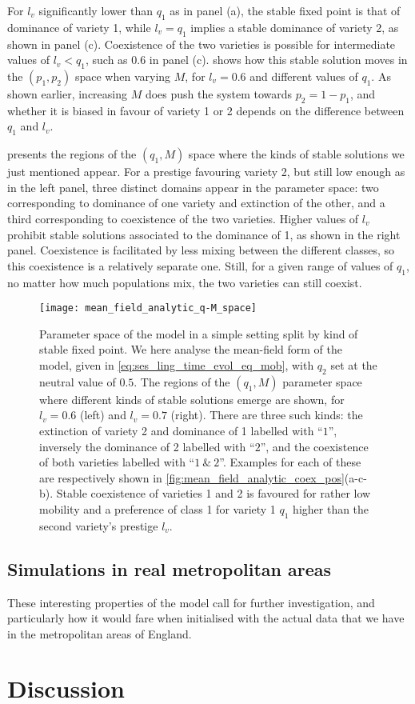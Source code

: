 \documentclass[../thesis.tex]{subfiles}
\begin{document}
For $l_v$ significantly lower than $q_1$ as in panel
(a), the stable fixed point is that of dominance of variety 1, while $l_v = q_1$ implies
a stable dominance of variety 2, as shown in panel (c). Coexistence of the two varieties
is possible for intermediate values of $l_v < q_1$, such as $0.6$ in panel (c).
 shows how this stable solution moves in the
$(p_1, p_2)$ space when varying $M$, for $l_v = 0.6$ and different values of $q_1$. As
shown earlier, increasing $M$ does push the system towards $p_2 = 1 - p_1$, and whether
it is biased in favour of variety 1 or 2 depends on the difference between $q_1$ and
$l_v$.

 presents the regions of the $(q_1, M)$ space
where the kinds of stable solutions we just mentioned appear. For a prestige favouring
variety 2, but still low enough as in the left panel, three distinct domains appear in
the parameter space: two corresponding to dominance of one variety and extinction of the
other, and a third corresponding to coexistence of the two varieties. Higher values of
$l_v$ prohibit stable solutions associated to the dominance of 1, as shown in the right
panel. Coexistence is facilitated by less mixing between the different classes, so this
coexistence is a relatively separate one. Still, for a given range of values of $q_1$,
no matter how much populations mix, the two varieties can still coexist.
\begin{figure}
  \centering
  \texttt{[image: mean\_field\_analytic\_q-M\_space]}
  \caption{Parameter space of the model in a simple setting split by kind of stable
  fixed point. We here analyse the mean-field form of the model, given in
  \cref{eq:ses_ling_time_evol_eq_mob}, with $q_2$ set at the neutral value of $0.5$. The
  regions of the $(q_1, M)$ parameter space where different kinds of stable solutions
  emerge are shown, for $l_v = 0.6$ (left) and $l_v = 0.7$ (right). There are three such
  kinds: the extinction of variety 2 and dominance of 1 labelled with ``$1$'', inversely
  the dominance of 2 labelled with ``$2$'', and the coexistence of both varieties
  labelled with ``$1~\&~2$''. Examples for each of these are respectively shown in
  \cref{fig:mean_field_analytic_coex_pos}(a-c-b). Stable coexistence of varieties 1 and
  2 is favoured for rather low mobility and a preference of class 1 for variety 1 $q_1$
  higher than the second variety's prestige $l_v$.}
  \label{fig:mean_field_analytic_q-M_space}
\end{figure}



\subsection{Simulations in real metropolitan areas}
These interesting properties of the model call for further investigation, and
particularly how it would fare when initialised with the actual data that we have in the
metropolitan areas of England.


\section{Discussion}
\end{document}
